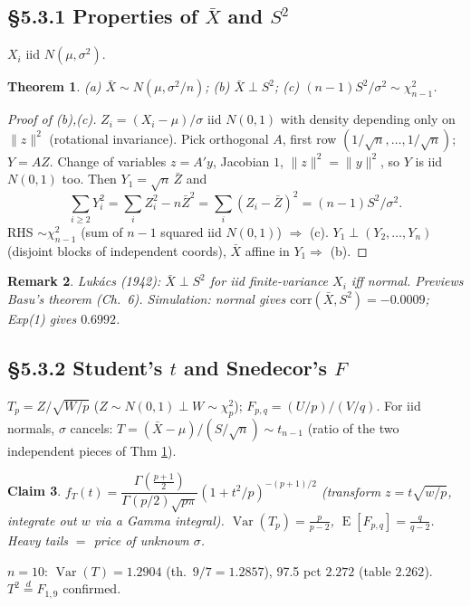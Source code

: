 \documentclass[11pt]{article}
\newtheorem{theorem}{Theorem}[section]
\newtheorem{remark}[theorem]{Remark}
\newtheorem{claim}[theorem]{Claim}
\DeclareMathOperator{\Var}{Var}\DeclareMathOperator{\Cov}{Cov}\DeclareMathOperator{\E}{E}
\newcommand{\dto}{\overset{d}{=}}\newcommand{\R}{\mathbb{R}}
\begin{document}
\subsection{\S5.3.1 Properties of $\bar X$ and $S^2$}
$X_i$ iid $N(\mu,\sigma^2)$.
\begin{theorem}\label{thm:ns}
(a) $\bar X\sim N(\mu,\sigma^2/n)$; (b) $\bar X\perp S^2$; (c) $(n-1)S^2/\sigma^2\sim\chi^2_{n-1}$.
\end{theorem}
\begin{proof}[Proof of (b),(c)]
$Z_i=(X_i-\mu)/\sigma$ iid $N(0,1)$ with density depending only on $\|z\|^2$ (rotational invariance). Pick orthogonal $A$, first row $(1/\sqrt n,\dots,1/\sqrt n)$; $Y=AZ$. Change of variables $z=A'y$, Jacobian $1$, $\|z\|^2=\|y\|^2$, so $Y$ is iid $N(0,1)$ too. Then $Y_1=\sqrt n\,\bar Z$ and
\[\sum_{i\ge 2}Y_i^2=\sum_i Z_i^2-n\bar Z^2=\sum_i(Z_i-\bar Z)^2=(n-1)S^2/\sigma^2.\]
RHS $\sim\chi^2_{n-1}$ (sum of $n-1$ squared iid $N(0,1)$) $\Rightarrow$ (c). $Y_1\perp(Y_2,\dots,Y_n)$ (disjoint blocks of independent coords), $\bar X$ affine in $Y_1\Rightarrow$ (b).
\end{proof}
\begin{remark}
Luk\'acs (1942): $\bar X\perp S^2$ for iid finite-variance $X_i$ \emph{iff} normal. Previews Basu's theorem (Ch.\ 6). Simulation: normal gives $\mathrm{corr}(\bar X,S^2)=-0.0009$; Exp(1) gives $0.6992$.
\end{remark}

\subsection{\S5.3.2 Student's $t$ and Snedecor's $F$}
$T_p=Z/\sqrt{W/p}$ ($Z\sim N(0,1)\perp W\sim\chi^2_p$); $F_{p,q}=(U/p)/(V/q)$. For iid normals, $\sigma$ cancels:
$T=(\bar X-\mu)/(S/\sqrt n)\sim t_{n-1}$ (ratio of the two independent pieces of Thm \ref{thm:ns}).
\begin{claim}
$f_T(t)=\dfrac{\Gamma(\frac{p+1}{2})}{\Gamma(p/2)\sqrt{p\pi}}(1+t^2/p)^{-(p+1)/2}$ (transform $z=t\sqrt{w/p}$, integrate out $w$ via a Gamma integral). $\Var(T_p)=\frac{p}{p-2}$, $\E[F_{p,q}]=\frac{q}{q-2}$. Heavy tails $=$ price of unknown $\sigma$.
\end{claim}
\begin{simbox}
$n=10$: $\Var(T)=1.2904$ (th.\ $9/7=1.2857$), 97.5 pct $2.272$ (table $2.262$). $T^2\dto F_{1,9}$ confirmed.
\end{simbox}
\end{document}
